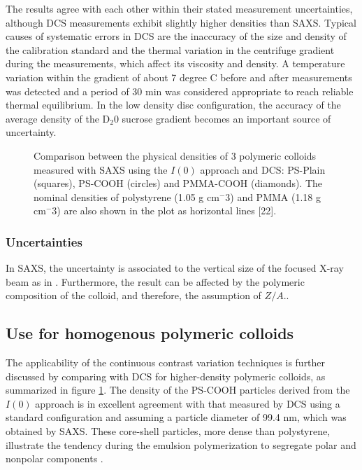 The results agree with each other within their stated measurement uncertainties, although DCS measurements exhibit slightly higher densities than SAXS. Typical causes of systematic errors in DCS are the inaccuracy of the size and density of the calibration standard and the thermal variation in the centrifuge gradient during the measurements, which affect its viscosity and density\citep{kamiti_simultaneous_2012}. A temperature variation within the gradient of about 7 degree C before and after measurements was detected and a period of 30 min was considered appropriate to reach reliable thermal equilibrium. In the low density disc configuration, the accuracy of the average density of the D$_2$0 sucrose gradient becomes an important source of uncertainty.
\begin{figure}
	\begin{center}
		
	\end{center}
	\caption{Comparison between the physical densities of 3 polymeric colloids measured with SAXS using the $I(0)$ approach and DCS: PS-Plain (squares), PS-COOH (circles) and PMMA-COOH (diamonds). The nominal densities of polystyrene (1.05 g cm$^-3$) and PMMA (1.18 g cm$^-3$) are also shown in the plot as horizontal lines [22].}
	\label{fig:DensityComparison}
\end{figure}
\subsubsection{Uncertainties}
In SAXS, the uncertainty is associated to the vertical size of the focused X-ray beam as in \citep{garcia-diez_nanoparticle_2015}. Furthermore, the result can be affected by the polymeric composition of the colloid, and therefore, the assumption of $Z/A$..

\subsection{Use for homogenous polymeric colloids}
The applicability of the continuous contrast variation techniques is further discussed by comparing with DCS for higher-density polymeric colloids, as summarized in figure \ref{fig:DensityComparison}. The density of the PS-COOH particles derived from the $I(0)$ approach is in excellent agreement with that measured by DCS using a standard configuration and assuming a particle diameter of 99.4 nm, which was obtained by SAXS. These core-shell particles, more dense than polystyrene\citep{garcia-diez_nanoparticle_2015}, illustrate the tendency during the emulsion polymerization to segregate polar and nonpolar components \citep{dingenouts_structure_1994}.

